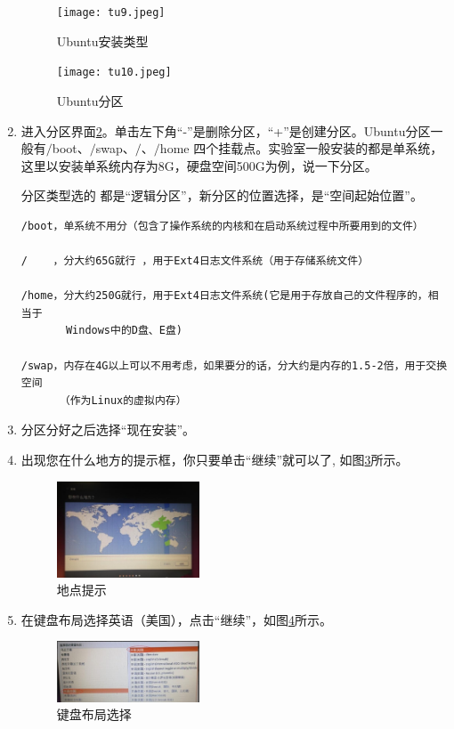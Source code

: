 \documentclass{article}
\begin{document}
\begin{enumerate}
\begin{figure}[!htb] %
\centering
\texttt{[image: tu9.jpeg]}
\caption{\small Ubuntu安装类型}
\label{tu9}
\end{figure} 
\begin{figure}[!htb] %
\centering
\texttt{[image: tu10.jpeg]}
\caption{\small Ubuntu分区}
\label{tu10}
\end{figure} 

\item  进入分区界面\ref{tu10}。单击左下角“-”是删除分区，“+”是创建分区。Ubuntu分区一般有$\slash$boot、$\slash$swap、$\slash$、$\slash$home 四个挂载点。实验室一般安装的都是单系统，这里以安装单系统内存为8G，硬盘空间500G为例，说一下分区。

分区类型选的 都是“逻辑分区”，新分区的位置选择，是“空间起始位置”。

\begin{verbatim}
/boot，单系统不用分（包含了操作系统的内核和在启动系统过程中所要用到的文件）

/    ，分大约65G就行 ，用于Ext4日志文件系统（用于存储系统文件）

/home，分大约250G就行，用于Ext4日志文件系统(它是用于存放自己的文件程序的，相当于
       Windows中的D盘、E盘)

/swap，内存在4G以上可以不用考虑，如果要分的话，分大约是内存的1.5-2倍，用于交换空间
      （作为Linux的虚拟内存）

\end{verbatim}

\item   分区分好之后选择“现在安装”。

\item 出现您在什么地方的提示框，你只要单击“继续”就可以了, 如图\ref{tu12}所示。

\begin{figure}[!htb] %
\centering
\includegraphics[width=0.4\textwidth]{tu12.jpeg}
\caption{\small 地点提示}
\label{tu12}
\end{figure} 

\item  在键盘布局选择英语（美国），点击“继续”，如图\ref{tu13}所示。
\begin{figure}[!htb] %
\centering
\includegraphics[width=0.4\textwidth]{tu13.jpeg}
\caption{\small 键盘布局选择}
\label{tu13}
\end{figure} 


\end{enumerate}
\end{document}
